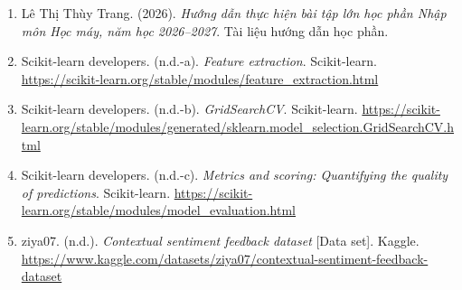 

\begingroup

\renewcommand{\labelenumi}{[\arabic{enumi}]}

\setlength{\itemsep}{10pt}

\begin{enumerate}

    \item
    Lê Thị Thùy Trang. (2026).
    \textit{Hướng dẫn thực hiện bài tập lớn
    học phần Nhập môn Học máy,
    năm học 2026--2027}.
    Tài liệu hướng dẫn học phần.

    \item
    Scikit-learn developers. (n.d.-a).
    \textit{Feature extraction}.
    Scikit-learn.
    \url{https://scikit-learn.org/stable/modules/feature_extraction.html}

    \item
    Scikit-learn developers. (n.d.-b).
    \textit{GridSearchCV}.
    Scikit-learn.
    \url{https://scikit-learn.org/stable/modules/generated/sklearn.model_selection.GridSearchCV.html}

    \item
    Scikit-learn developers. (n.d.-c).
    \textit{Metrics and scoring:
    Quantifying the quality of predictions}.
    Scikit-learn.
    \url{https://scikit-learn.org/stable/modules/model_evaluation.html}

    \item
    ziya07. (n.d.).
    \textit{Contextual sentiment feedback dataset}
    [Data set].
    Kaggle.
    \url{https://www.kaggle.com/datasets/ziya07/contextual-sentiment-feedback-dataset}

\end{enumerate}

\endgroup
